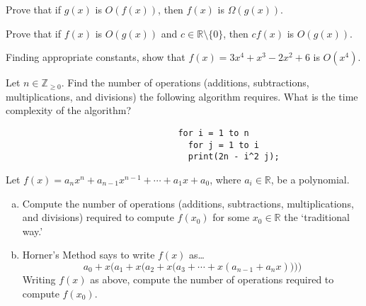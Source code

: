 \documentclass[11pt,letterpaper]{article}
\begin{document}
\homework{}

 Prove that if $g(x)$ is $O(f(x))$, then $f(x)$ is $\Omega(g(x))$. \pspace





\newpage





 Prove that if $f(x)$ is $O(g(x))$ and $c \in \mathbb{R} \setminus \{ 0 \}$, then $cf(x)$ is $O(g(x))$. \pspace





\newpage





 Finding appropriate constants, show that $f(x)= 3x^4 + x^3 - 2x^2 + 6$ is $O(x^4)$. \pspace





\newpage





 Let $n \in \mathbb{Z}_{\geq 0}$. Find the number of operations (additions, subtractions, multiplications, and divisions) the following algorithm requires. What is the time complexity of the algorithm?
	\begin{verbatim}
	                              for i = 1 to n
	                                for j = 1 to i
	                                print(2n - i^2 j); 
	\end{verbatim} \pspace





\newpage





 Let $f(x)= a_n x^n + a_{n-1} x^{n-1} + \cdots + a_1x + a_0$, where $a_i \in \mathbb{R}$, be a polynomial. 
\begin{enumerate}[(a)]
\item Compute the number of operations (additions, subtractions, multiplications, and divisions) required to compute $f(x_0)$ for some $x_0 \in \mathbb{R}$ the `traditional way.' 
\item Horner's Method says to write $f(x)$ as\dots
	\[
	a_0 + x \bigg(a_1 + x \big( a_2 + x \big( a_3 + \cdots + x (a_{n-1} + a_n x ) \big) \big) \bigg) 
	\]
Writing $f(x)$ as above, compute the number of operations required to compute $f(x_0)$. 
\end{enumerate}
\end{document}
